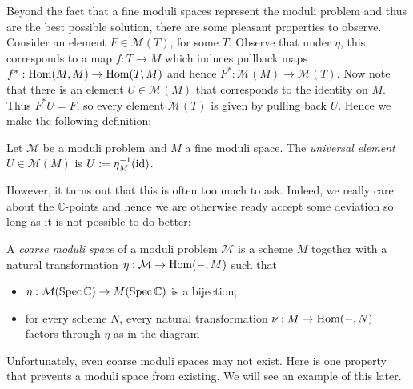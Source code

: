 \documentclass[12pt]{ociamthesis}  %
\begin{document}
Beyond the fact that a fine moduli spaces represent the moduli
problem and thus are the best possible solution, there are some
pleasant properties to observe. Consider an element
$F\in\mathcal M(T)$, for some $T$. Observe that under $\eta$,
this corresponds to a map $f:T\to M$ which induces pullback maps
$f^* : \operatorname{Hom}(M,M)\to\operatorname{Hom}(T,M)$ and hence
$F^* : \mathcal M(M)\to \mathcal M(T)$.
Now note that there is an element $U\in\mathcal M(M)$ that
corresponds to the identity on $M$. Thus $F^* U = F$, so every
element $\mathcal M(T)$ is given by pulling back $U$. Hence
we make the following definition:

\begin{definition}
  Let $\mathcal M$ be a moduli problem and $M$ a fine moduli space.
  The \emph{universal element} $U\in\mathcal M(M)$ is
  $U:=\eta^{-1}_M (\operatorname{id})$.
\end{definition}

\begin{example}
  \missingexample
\end{example}

However, it turns out that this is often too much to ask. Indeed,
we really care about the $\mathbb{C}$-points and hence
we are otherwise ready accept some deviation so long as it is not
possible to do better:

\begin{definition}\missingcitation
  A \emph{coarse moduli space} of a moduli problem $\mathcal M$
  is a scheme $M$ together with a natural transformation
  $\eta : \mathcal M \to \operatorname{Hom}(-,M)$ such that
  \begin{itemize}
    \item $\eta : \mathcal M(\operatorname{Spec}\mathbb{C})\to M(\operatorname{Spec}\mathbb{C})$ is a bijection;
    \item for every scheme $N$, every natural transformation
          $\nu : M \to \operatorname{Hom}(-,N)$ factors through $\eta$ as in the diagram
  \end{itemize}
\end{definition}

\begin{example}
  \missingexample
\end{example}

Unfortunately, even coarse moduli spaces may not exist. Here is
one property that prevents a moduli space from existing. We will
see an example of this later. 
\end{document}
